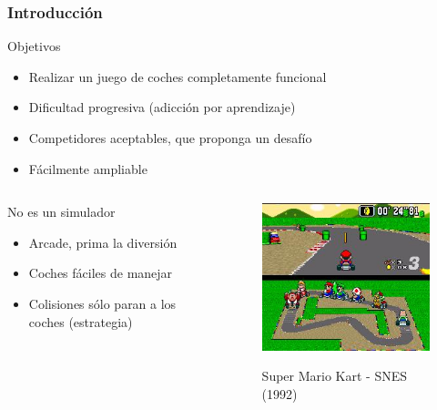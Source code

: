 \begin{frame}
    \frametitle{Introducción}

    \begin{block}{Objetivos}
        \begin{itemize}
            \item Realizar un juego de coches completamente funcional
            \item Dificultad progresiva (adicción por aprendizaje)
            \item Competidores aceptables, que proponga un desafío
            \item Fácilmente ampliable
        \end{itemize}
    \end{block}

    \begin{columns}
    
        \column{200px}
        \begin{alertblock}{No es un simulador}
            \begin{itemize}
                \item Arcade, prima la diversión
                \item Coches fáciles de manejar
                \item Colisiones sólo paran a los coches (estrategia)
            \end{itemize}
        \end{alertblock}
        
        \column{100px}
        \begin{figure}
          \label{logo_latex}
          \begin{center}
            \includegraphics[scale=0.5]{imagenes/super_mario_kart.jpg}
          \end{center}
          Super Mario Kart - SNES (1992)
        \end{figure}
        
    \end{columns}
    
\end{frame}
